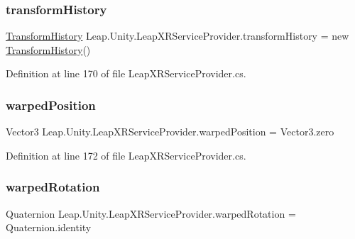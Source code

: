 \subsubsection{\texorpdfstring{transformHistory}{transformHistory}}
{\footnotesize\ttfamily \mbox{\hyperlink{class_leap_1_1_unity_1_1_transform_history}{Transform\+History}} Leap.\+Unity.\+Leap\+X\+R\+Service\+Provider.\+transform\+History = new \mbox{\hyperlink{class_leap_1_1_unity_1_1_transform_history}{Transform\+History}}()\hspace{0.3cm}{\ttfamily [protected]}}



Definition at line 170 of file Leap\+X\+R\+Service\+Provider.\+cs.

\mbox{\label{class_leap_1_1_unity_1_1_leap_x_r_service_provider_aa4be13a6f05121d88aded72a447efd8f}} 
\subsubsection{\texorpdfstring{warpedPosition}{warpedPosition}}
{\footnotesize\ttfamily Vector3 Leap.\+Unity.\+Leap\+X\+R\+Service\+Provider.\+warped\+Position = Vector3.\+zero\hspace{0.3cm}{\ttfamily [protected]}}



Definition at line 172 of file Leap\+X\+R\+Service\+Provider.\+cs.

\mbox{\label{class_leap_1_1_unity_1_1_leap_x_r_service_provider_a2b4417c08a92b9ad2ef8f5dd76248915}} 
\subsubsection{\texorpdfstring{warpedRotation}{warpedRotation}}
{\footnotesize\ttfamily Quaternion Leap.\+Unity.\+Leap\+X\+R\+Service\+Provider.\+warped\+Rotation = Quaternion.\+identity\hspace{0.3cm}{\ttfamily [protected]}}




